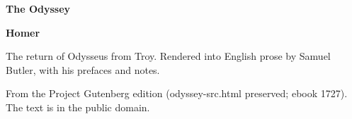 \documentclass[11pt,letterpaper]{article}
\begin{document}
\color{ink}

\begin{titlepage}
\centering
\vspace*{4em}
{\LARGE\bfseries\color{heading} The Odyssey\par}
\vspace{2em}
{\Large\bfseries\color{heading} Homer\par}
\vspace{2.5em}
{\itshape\color{subhead}\parbox{0.8\linewidth}{\centering The return of Odysseus from Troy. Rendered into English prose by Samuel Butler, with his prefaces and notes.\par}}
\vfill
{\small From the Project Gutenberg edition (odyssey-src.html preserved; ebook 1727). The text is in the public domain.\par}
\vspace{2em}
\end{titlepage}

\tableofcontents


\end{document}

